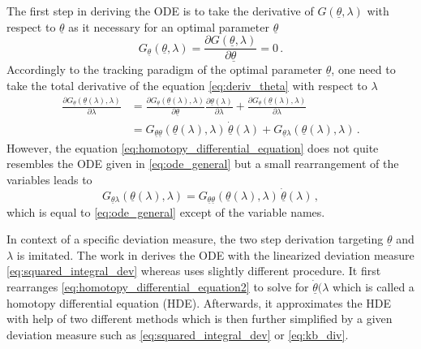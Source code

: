 \documentclass[a4paper]{IEEEtran}
\begin{document}
The first step in deriving the ODE is to take the derivative of $G(\underline{\theta},\lambda)$ with respect to $\underline{\theta}$ as it necessary for an optimal parameter $\underline{\theta}$
\begin{equation}
    G_{\underline{\theta}}(\underline{\theta}, \lambda) = \frac{\partial G(\underline{\theta}, \lambda)}{\partial \underline{\theta}} = 0 \,.
    \label{eq:deriv_theta}
\end{equation}
Accordingly to the tracking paradigm of the optimal parameter $\underline{\theta}$, one need to take the total derivative of the equation \eqref{eq:deriv_theta} with respect to $\lambda$
\begin{equation}
    \begin{split}
        \frac{\partial G_{\underline{\theta}}(\underline{\theta}(\lambda),\lambda)}{\partial \lambda} &= \frac{\partial G_{\underline{\theta}}(\underline{\theta}(\lambda),\lambda)}{\partial \underline{\theta}} \frac{\partial \underline{\theta}(\lambda)}{\partial \lambda} + \frac{\partial G_{\underline{\theta}}(\underline{\theta}(\lambda),\lambda)}{\partial \lambda} \\
        &= G_{\underline{\theta}\underline{\theta}}(\underline{\theta}(\lambda),\lambda) \, \underline{\dot{\theta}}(\lambda) + G_{\underline{\theta}\lambda}(\underline{\theta}(\lambda),\lambda) \,.
    \end{split}
    \label{eq:homotopy_differential_equation}
\end{equation}
However, the equation \eqref{eq:homotopy_differential_equation} does not quite resembles the ODE given in \eqref{eq:ode_general} but a small rearrangement of the variables leads to
\begin{equation}
    G_{\underline{\theta}\lambda}(\underline{\theta}(\lambda),\lambda) = G_{\underline{\theta}\underline{\theta}}(\underline{\theta}(\lambda),\lambda) \, \underline{\dot{\theta}}(\lambda) \,,
    \label{eq:homotopy_differential_equation2}
\end{equation}
which is equal to \eqref{eq:ode_general} except of the variable names.

In context of a specific deviation measure, the two step derivation targeting $\underline{\theta}$ and $\lambda$ is imitated. The work in \cite{hanebeck2003} derives the ODE with the linearized deviation measure \eqref{eq:squared_integral_dev} whereas \cite{hagmar2011} uses slightly different
procedure. It first rearranges \eqref{eq:homotopy_differential_equation2} to solve for $\underline{\dot{\theta}}(\lambda$ which is called a homotopy differential equation (HDE). Afterwards, it approximates the HDE with help of two different methods which is then further simplified
by a given deviation measure such as \eqref{eq:squared_integral_dev} or \eqref{eq:kb_div}.
\end{document}
